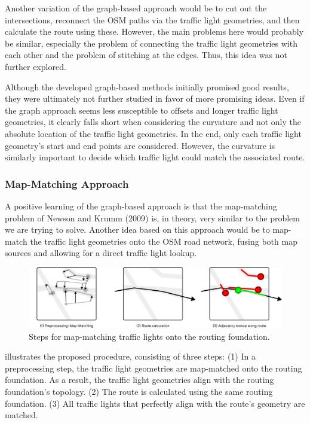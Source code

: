Another variation of the graph-based approach would be to cut out the intersections, reconnect the OSM paths via the traffic light geometries, and then calculate the route using these. However, the main problems here would probably be similar, especially the problem of connecting the traffic light geometries with each other and the problem of stitching at the edges. Thus, this idea was not further explored.

Although the developed graph-based methods initially promised good results, they were ultimately not further studied in favor of more promising ideas. Even if the graph approach seems less susceptible to offsets and longer traffic light geometries, it clearly falls short when considering the curvature and not only the absolute location of the traffic light geometries. In the end, only each traffic light geometry's start and end points are considered. However, the curvature is similarly important to decide which traffic light could match the associated route.

\subsubsection{Map-Matching Approach}

A positive learning of the graph-based approach is that the map-matching problem of Newson and Krumm (2009) \cite{newson_hidden_2009} is, in theory, very similar to the problem we are trying to solve. Another idea based on this approach would be to map-match the traffic light geometries onto the OSM road network, fusing both map sources and allowing for a direct traffic light lookup.

\begin{figure}[htbp]
\centering
\includegraphics[width=\linewidth]{images/sg-selection-map-matching-approach.pdf}
\caption{Steps for map-matching traffic lights onto the routing foundation.}
\label{fig:sg-selection-map-matching-approach}
\end{figure}

 illustrates the proposed procedure, consisting of three steps: (1) In a preprocessing step, the traffic light geometries are map-matched onto the routing foundation. As a result, the traffic light geometries align with the routing foundation's topology. (2) The route is calculated using the same routing foundation. (3) All traffic lights that perfectly align with the route's geometry are matched.

